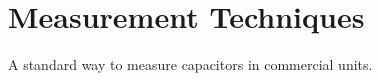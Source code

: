\section{Measurement Techniques}


A standard way to measure capacitors in commercial units. \cite{murCaps}
